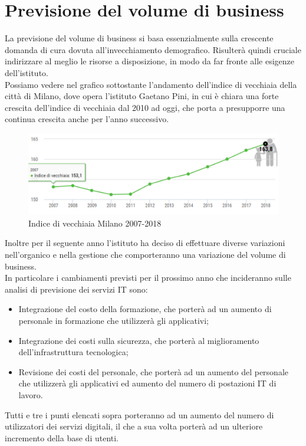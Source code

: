 \newpage
\section{Previsione del volume di business} \label{ref:previsione}
La previsione del volume di business si basa essenzialmente sulla crescente domanda di cura dovuta all’invecchiamento demografico. Risulterà quindi cruciale indirizzare al meglio le risorse a disposizione, in modo da far fronte alle esigenze dell'istituto.\\
Possiamo vedere nel grafico sottostante l'andamento dell'indice di vecchiaia della città di Milano, dove opera l'istituto Gaetano Pini, in cui è chiara una forte crescita dell'indice di vecchiaia dal 2010 ad oggi, che porta a presupporre una continua crescita anche per l'anno successivo.
\begin{figure}[h!]
	\centering
	\includegraphics[width=\linewidth]{./img/vecchiaia.jpg}
	\caption{Indice di vecchiaia Milano 2007-2018}\label{fig:vecchiaia}
\end{figure}

Inoltre per il seguente anno l'istituto ha deciso di effettuare diverse variazioni nell'organico e nella gestione che comporteranno una variazione del volume di business. \\
In particolare i cambiamenti previsti per il prossimo anno che incideranno sulle analisi di previsione dei servizi IT sono:
\begin{itemize}
	\item Integrazione del costo della formazione, che porterà ad un aumento di personale in formazione che utilizzerà gli applicativi;
	\item Integrazione dei costi sulla sicurezza, che porterà al miglioramento dell'infrastruttura tecnologica;
	\item Revisione dei costi del personale, che porterà ad un aumento del personale che utilizzerà gli applicativi ed aumento del numero di postazioni IT di lavoro.
\end{itemize}

Tutti e tre i punti elencati sopra porteranno ad un aumento del numero di utilizzatori dei servizi digitali, il che a sua volta porterà ad un ulteriore incremento della base di utenti.